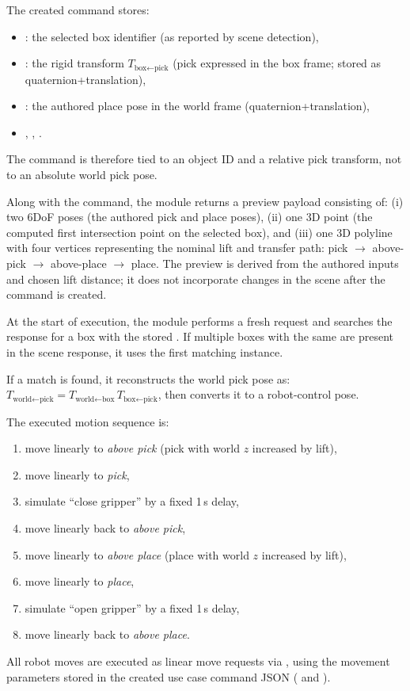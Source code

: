 The created command stores:
\begin{itemize}[nosep]
    \item {}: the selected box identifier (as reported by scene detection),
    \item {}: the rigid transform $T_{\text{box}\leftarrow\text{pick}}$ (pick expressed in the box frame; stored as quaternion+translation),
    \item {}: the authored place pose in the world frame (quaternion+translation),
    \item {}, , .
\end{itemize}
The command is therefore tied to an object ID and a relative pick transform, not to an absolute world pick pose.

Along with the command, the module returns a preview payload consisting of:
(i) two 6DoF poses (the authored pick and place poses),
(ii) one 3D point (the computed first intersection point on the selected box), and
(iii) one 3D polyline with four vertices representing the nominal lift and transfer path:
pick $\rightarrow$ above-pick $\rightarrow$ above-place $\rightarrow$ place.
The preview is derived from the authored inputs and chosen lift distance; it does not incorporate changes in the scene after the command is created.

At the start of execution, the module performs a fresh  request and searches the response for a box with the stored .
If multiple boxes with the same  are present in the scene response, it uses the first matching instance.

If a match is found, it reconstructs the world pick pose as:
$T_{\text{world}\leftarrow\text{pick}} = T_{\text{world}\leftarrow\text{box}} \, T_{\text{box}\leftarrow\text{pick}}$,
then converts it to a robot-control pose.

The executed motion sequence is:
\begin{enumerate}[nosep,label=(\arabic*)]
    \item move linearly to \emph{above pick} (pick with world $z$ increased by lift),
    \item move linearly to \emph{pick},
    \item simulate ``close gripper'' by a fixed 1\,s delay,
    \item move linearly back to \emph{above pick},
    \item move linearly to \emph{above place} (place with world $z$ increased by lift),
    \item move linearly to \emph{place},
    \item simulate ``open gripper'' by a fixed 1\,s delay,
    \item move linearly back to \emph{above place}.
\end{enumerate}
All robot moves are executed as linear move requests via , using the movement parameters stored in the created use case command JSON ( and ).

